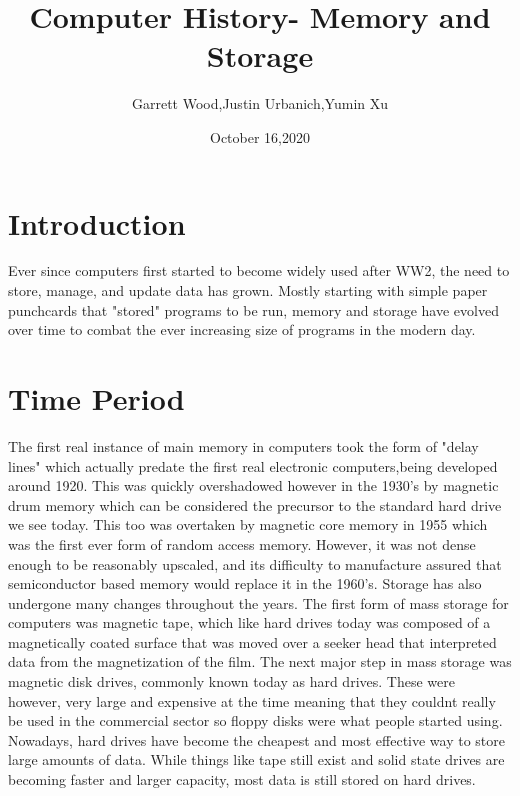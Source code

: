 \documentclass{article}
\title{Computer History- Memory and Storage}
\author{Garrett Wood,Justin Urbanich,Yumin Xu}
\date{October 16,2020}
\begin{document}
\maketitle

\section{Introduction}
Ever since computers first started to become widely used after WW2, the need to store, manage, and update data has grown. Mostly starting with simple paper punchcards that "stored" programs to be run, memory and storage have evolved over time to combat the ever increasing size of programs in the modern day.
\section{Time Period}
The first real instance of main memory in computers took the form of "delay lines" which actually predate the first real electronic computers,being developed around 1920. This was quickly overshadowed however in the 1930's by magnetic drum memory which can be considered the precursor to the standard hard drive we see today. This too was overtaken by magnetic core memory in 1955 which was the first ever form of random access memory. However, it was not dense enough to be reasonably upscaled, and its difficulty to manufacture assured that semiconductor based memory would replace it in the 1960's. Storage has also undergone many changes throughout the years. 
The first form of mass storage for computers was magnetic tape, which like hard drives today was composed of a magnetically coated surface that was moved over a seeker head that interpreted data from the magnetization of the film. The next major step in mass storage was magnetic disk drives, commonly known today as hard drives. These were however, very large and expensive at the time meaning that they couldnt really be used in the commercial sector so floppy disks were what people started using. Nowadays, hard drives have become the cheapest and most effective way to store large amounts of data. While things like tape still exist and solid state drives are becoming faster and larger capacity, most data is still stored on hard drives.
\end{document}
